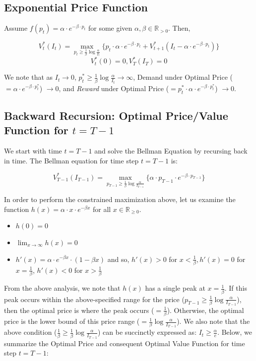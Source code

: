 \documentclass[12pt]{amsart}
\begin{document}
   \subsection{Exponential Price Function}
   Assume $f(p_t) = \alpha \cdot e^{-\beta \cdot p_t}$ for some given $\alpha, \beta \in \mathbb{R}_{> 0}$. Then,
   
   $$V_t^*(I_t) = \max_{p_t \geq \frac 1 \beta \log \frac \alpha {I_t}} \{ p_t \cdot \alpha \cdot e^{-\beta \cdot p_t}  + V_{t+1}^*(I_t - \alpha \cdot e^{-\beta \cdot p_t}) \}$$
   $$V_t^*(0) = 0, V_T^*(I_T) = 0$$
   
   We note that as $I_t \to 0$, $p_t^* \geq \frac 1 \beta \log \frac \alpha {I_t} \to \infty$, Demand under Optimal Price ($= \alpha \cdot e^{-\beta \cdot p_t^*}$) $\to 0$, and {\em Reward} under Optimal Price ($= p_t^* \cdot \alpha \cdot e^{-\beta \cdot p_t^*}$) $\to 0$.
   
   \subsection{Backward Recursion: Optimal Price/Value Function for $t = T-1$} 
   We start with time $t = T-1$ and solve the Bellman Equation by recursing back in time. The Bellman equation for time step $t = T-1$ is:
      
   $$V_{T-1}^*(I_{T-1}) = \max_{p_{T-1} \geq \frac 1 \beta \log \frac \alpha {I_{T-1}}} \{ \alpha \cdot p_{T-1} \cdot  e^{-\beta \cdot p_{T-1}} \}$$
   
   In order to perform the constrained maximization above, let us examine the function $h(x) = \alpha \cdot x \cdot e^{-\beta x}$ for all $x \in \mathbb{R}_{\geq 0}$.
   \begin{itemize}
   \item $h(0) = 0$
   \item $\lim_{x \to \infty} h(x) = 0$
   \item $h'(x) = \alpha \cdot e^{-\beta x} \cdot (1 - \beta x)$ and so, $h'(x) > 0$ for $x < \frac 1 \beta, h'(x) = 0$ for $x = \frac 1 \beta$, $h'(x) < 0$ for $x > \frac 1 \beta$
   \end{itemize}

From the above analysis, we note that $h(x)$ has a single peak at $x = \frac 1 \beta$. If this peak occurs within the above-specified range for the price ($p_{T-1} \geq \frac 1 \beta \log \frac \alpha {I_{T-1}}$), then the optimal price is where the peak occurs ($= \frac 1 \beta$). Otherwise, the optimal price is the lower bound of this price range ($= \frac 1 \beta \log \frac \alpha {I_{T-1}}$). We also note that the above condition ($\frac 1 \beta \geq \frac 1 \beta \log \frac \alpha {I_{T-1}}$) can be succinctly expressed as: $I_t \geq \frac \alpha e$. Below, we summarize the Optimal Price and consequent Optimal Value Function for time step $t = T-1$:
\end{document}
